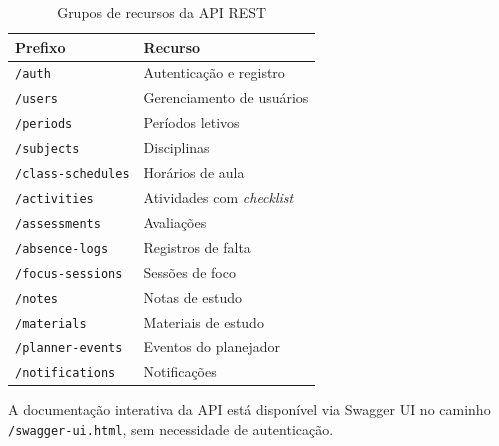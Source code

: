 \begin{table}[H]
  \centering
  \caption{Grupos de recursos da API REST}
  \label{qdr:endpoints-principais}
  \begin{tabular}{ll}
    \toprule
    \textbf{Prefixo}          & \textbf{Recurso}            \\
    \midrule
    \texttt{/auth}            & Autenticação e registro      \\
    \texttt{/users}           & Gerenciamento de usuários    \\
    \texttt{/periods}         & Períodos letivos             \\
    \texttt{/subjects}        & Disciplinas                  \\
    \texttt{/class-schedules} & Horários de aula             \\
    \texttt{/activities}      & Atividades com \textit{checklist} \\
    \texttt{/assessments}     & Avaliações                   \\
    \texttt{/absence-logs}    & Registros de falta           \\
    \texttt{/focus-sessions}  & Sessões de foco              \\
    \texttt{/notes}           & Notas de estudo              \\
    \texttt{/materials}       & Materiais de estudo          \\
    \texttt{/planner-events}  & Eventos do planejador        \\
    \texttt{/notifications}   & Notificações                 \\
    \bottomrule
  \end{tabular}
\end{table}

A documentação interativa da API está disponível via Swagger UI no caminho
\texttt{/swagger-ui.html}, sem necessidade de autenticação.
